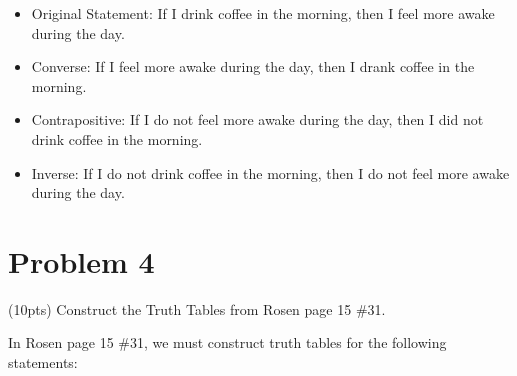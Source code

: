 \documentclass{article}
\begin{document}
\begin{itemize}
    \item Original Statement: If I drink coffee in the morning, then I feel more awake during the day. 
    \item Converse: If I feel more awake during the day, then I drank coffee in the morning.
    \item Contrapositive: If I do not feel more awake during the day, then I did not drink coffee in the morning.
    \item Inverse: If I do not drink coffee in the morning, then I do not feel more awake during the day.
\end{itemize}



\clearpage

\section{Problem 4}

(10pts) Construct the Truth Tables from Rosen page 15 \#31.

\medskip

In  Rosen page 15 \#31, we must construct truth tables for the following statements:
\end{document}
